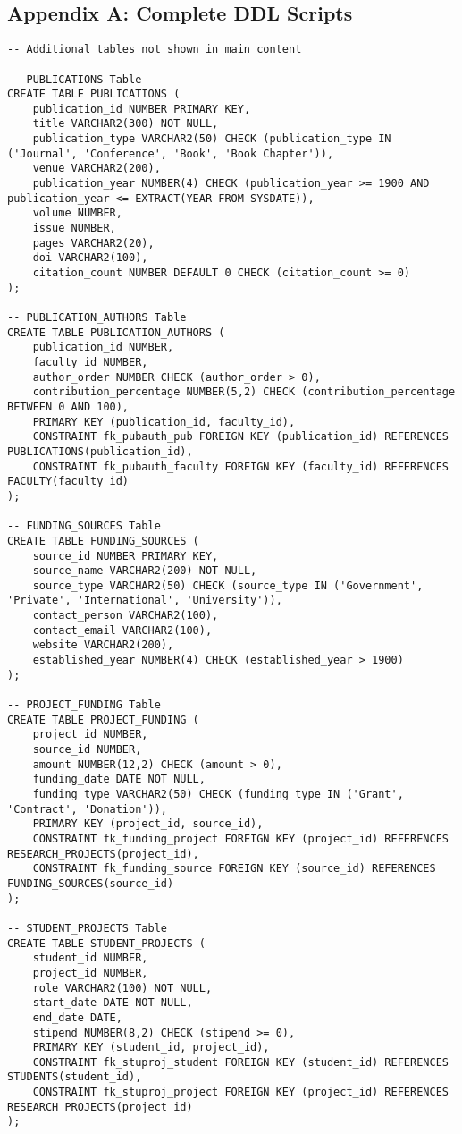 \documentclass[12pt,a4paper]{article}
\begin{document}
\subsection{Appendix A: Complete DDL Scripts}
\begin{lstlisting}[style=sqlstyle]
-- Additional tables not shown in main content

-- PUBLICATIONS Table
CREATE TABLE PUBLICATIONS (
    publication_id NUMBER PRIMARY KEY,
    title VARCHAR2(300) NOT NULL,
    publication_type VARCHAR2(50) CHECK (publication_type IN ('Journal', 'Conference', 'Book', 'Book Chapter')),
    venue VARCHAR2(200),
    publication_year NUMBER(4) CHECK (publication_year >= 1900 AND publication_year <= EXTRACT(YEAR FROM SYSDATE)),
    volume NUMBER,
    issue NUMBER,
    pages VARCHAR2(20),
    doi VARCHAR2(100),
    citation_count NUMBER DEFAULT 0 CHECK (citation_count >= 0)
);

-- PUBLICATION_AUTHORS Table
CREATE TABLE PUBLICATION_AUTHORS (
    publication_id NUMBER,
    faculty_id NUMBER,
    author_order NUMBER CHECK (author_order > 0),
    contribution_percentage NUMBER(5,2) CHECK (contribution_percentage BETWEEN 0 AND 100),
    PRIMARY KEY (publication_id, faculty_id),
    CONSTRAINT fk_pubauth_pub FOREIGN KEY (publication_id) REFERENCES PUBLICATIONS(publication_id),
    CONSTRAINT fk_pubauth_faculty FOREIGN KEY (faculty_id) REFERENCES FACULTY(faculty_id)
);

-- FUNDING_SOURCES Table
CREATE TABLE FUNDING_SOURCES (
    source_id NUMBER PRIMARY KEY,
    source_name VARCHAR2(200) NOT NULL,
    source_type VARCHAR2(50) CHECK (source_type IN ('Government', 'Private', 'International', 'University')),
    contact_person VARCHAR2(100),
    contact_email VARCHAR2(100),
    website VARCHAR2(200),
    established_year NUMBER(4) CHECK (established_year > 1900)
);

-- PROJECT_FUNDING Table
CREATE TABLE PROJECT_FUNDING (
    project_id NUMBER,
    source_id NUMBER,
    amount NUMBER(12,2) CHECK (amount > 0),
    funding_date DATE NOT NULL,
    funding_type VARCHAR2(50) CHECK (funding_type IN ('Grant', 'Contract', 'Donation')),
    PRIMARY KEY (project_id, source_id),
    CONSTRAINT fk_funding_project FOREIGN KEY (project_id) REFERENCES RESEARCH_PROJECTS(project_id),
    CONSTRAINT fk_funding_source FOREIGN KEY (source_id) REFERENCES FUNDING_SOURCES(source_id)
);

-- STUDENT_PROJECTS Table
CREATE TABLE STUDENT_PROJECTS (
    student_id NUMBER,
    project_id NUMBER,
    role VARCHAR2(100) NOT NULL,
    start_date DATE NOT NULL,
    end_date DATE,
    stipend NUMBER(8,2) CHECK (stipend >= 0),
    PRIMARY KEY (student_id, project_id),
    CONSTRAINT fk_stuproj_student FOREIGN KEY (student_id) REFERENCES STUDENTS(student_id),
    CONSTRAINT fk_stuproj_project FOREIGN KEY (project_id) REFERENCES RESEARCH_PROJECTS(project_id)
);
\end{lstlisting}
\end{document}
